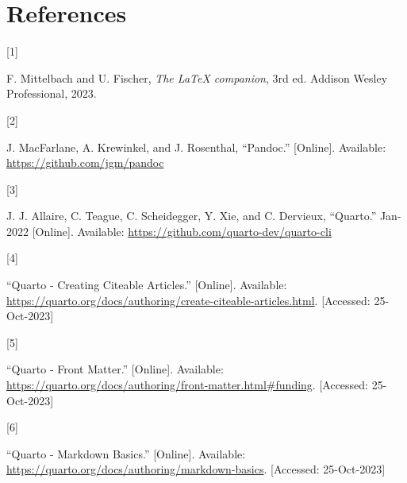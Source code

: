\documentclass[
  journal,
]{IEEEtran}%
\newlength{\cslhangindent}
\newlength{\csllabelwidth}
\newlength{\cslentryspacingunit} %
\newenvironment{CSLReferences}[2] %
 {%
  \setlength{\parindent}{0pt}
  \ifodd #1
  \let\oldpar\par
  \def\par{\hangindent=\cslhangindent\oldpar}
  \fi
  \setlength{\parskip}{#2\cslentryspacingunit}
 }%
 {}
\newcommand{\CSLLeftMargin}[1]{\parbox[t]{\csllabelwidth}{#1}}
\newcommand{\CSLRightInline}[1]{\parbox[t]{\linewidth - \csllabelwidth}{#1}\break}
\theoremstyle{plain}
\theoremstyle{remark}
\begin{document}
\hypertarget{references}{%
\section*{References}\label{references}}

\hypertarget{refs}{}
\begin{CSLReferences}{0}{0}
\leavevmode{}%
\CSLLeftMargin{{[}1{]} }%
\CSLRightInline{F. Mittelbach and U. Fischer, \emph{The {LaTeX}
companion}, 3rd ed. {Addison Wesley Professional}, 2023. }

\leavevmode{}%
\CSLLeftMargin{{[}2{]} }%
\CSLRightInline{J. MacFarlane, A. Krewinkel, and J. Rosenthal,
{``{Pandoc}.''} {[}Online{]}. Available:
\url{https://github.com/jgm/pandoc}}

\leavevmode{}%
\CSLLeftMargin{{[}3{]} }%
\CSLRightInline{J. J. Allaire, C. Teague, C. Scheidegger, Y. Xie, and C.
Dervieux, {``{Quarto}.''} Jan-2022 {[}Online{]}. Available:
\url{https://github.com/quarto-dev/quarto-cli}}

\leavevmode{}%
\CSLLeftMargin{{[}4{]} }%
\CSLRightInline{{``Quarto - {Creating Citeable Articles}.''}
{[}Online{]}. Available:
\url{https://quarto.org/docs/authoring/create-citeable-articles.html}.
{[}Accessed: 25-Oct-2023{]}}

\leavevmode{}%
\CSLLeftMargin{{[}5{]} }%
\CSLRightInline{{``Quarto - {Front Matter}.''} {[}Online{]}. Available:
\url{https://quarto.org/docs/authoring/front-matter.html\#funding}.
{[}Accessed: 25-Oct-2023{]}}

\leavevmode{}%
\CSLLeftMargin{{[}6{]} }%
\CSLRightInline{{``Quarto - {Markdown Basics}.''} {[}Online{]}.
Available: \url{https://quarto.org/docs/authoring/markdown-basics}.
{[}Accessed: 25-Oct-2023{]}}

\end{CSLReferences}


\ifCLASSOPTIONcaptionsoff
  \newpage
\fi

\end{document}
